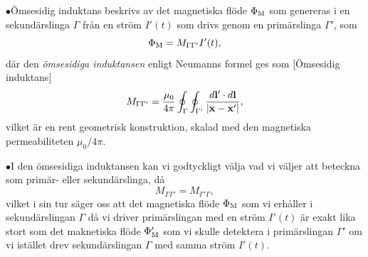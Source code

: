 \item{$\bullet$}{{\"O}msesidig induktans beskrivs av det magnetiska fl{\"o}de
  $\Phi_{\rm M}$ som genereras i en sekund{\"a}rslinga $\Gamma$ fr{\aa}n en
  str{\"o}m $I'(t)$ som drivs genom en prim{\"a}rslinga $\Gamma'$, som
  $$
    \Phi_{\rm M}=M_{\Gamma\Gamma'} I'(t),
  $$
  d{\"a}r den {\it {\"o}msesidiga induktansen} enligt Neumanns formel ges som
  [{\"O}msesidig induktans]
  $$
    M_{\Gamma\Gamma'}={{\mu_0}\over{4\pi}}\oint_{\Gamma}\oint_{\Gamma'}
          {{d{\bf l}'\cdot d{\bf l}}\over{|{\bf x}-{\bf x}'|}},
  $$
  vilket {\"a}r en rent geometrisk konstruktion, skalad med den magnetiska
  permeabiliteten $\mu_0/4\pi$.}
\item{$\bullet$}{I den {\"o}msesidiga induktansen kan vi godtyckligt v{\"a}lja
  vad vi v{\"a}ljer att beteckna som prim{\"a}r- eller sekund{\"a}rslinga,
  d{\aa}
  $$
    M_{\Gamma\Gamma'}=M_{\Gamma'\Gamma},
  $$
  vilket i sin tur s{\"a}ger oss att det magnetiska fl{\"o}de $\Phi_{\rm M}$
  som vi erh{\aa}ller i sekund{\"a}rslingan $\Gamma$ d{\aa} vi driver
  prim{\"a}rslingan med en str{\"o}m $I'(t)$ {\"a}r exakt lika stort
  som det maknetiska fl{\"o}de $\Phi'_{\rm M}$ som vi skulle detektera
  i prim{\"a}rslingan $\Gamma'$ om vi ist{\"a}llet drev sekund{\"a}rslingan
  $\Gamma$ med samma str{\"o}m $I'(t)$.}
\index
\bye
